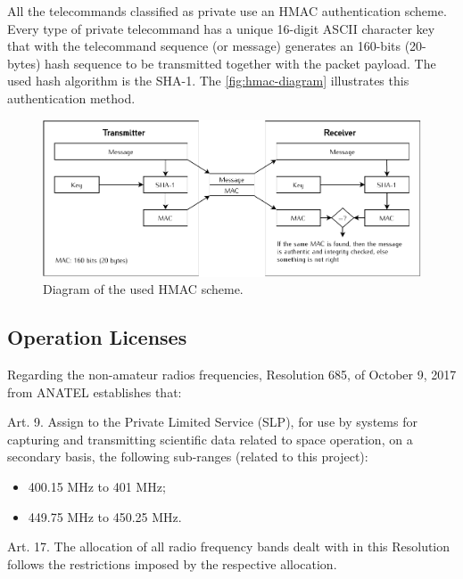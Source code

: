 All the telecommands classified as private use an HMAC authentication scheme. Every type of private telecommand has a unique 16-digit ASCII character key that with the telecommand sequence (or message) generates an 160-bits (20-bytes) hash sequence to be transmitted together with the packet payload. The used hash algorithm is the SHA-1. The \autoref{fig:hmac-diagram} illustrates this authentication method.

\begin{figure}[!htb]
    \begin{center}
        \includegraphics[width=\textwidth]{figures/hmac-diagram.pdf}
        \caption{Diagram of the used HMAC scheme.}
        \label{fig:hmac-diagram}
    \end{center}
\end{figure}

\subsection{Operation Licenses}


Regarding the non-amateur radios frequencies, Resolution 685, of October 9, 2017 from ANATEL establishes that:

Art. 9. Assign to the Private Limited Service (SLP), for use by systems for capturing and transmitting scientific data related to space operation, on a secondary basis, the following sub-ranges (related to this project):

\begin{itemize}
\item 400.15 MHz to 401 MHz;
\item 449.75 MHz to 450.25 MHz.
\end{itemize}

Art. 17. The allocation of all radio frequency bands dealt with in this Resolution follows the restrictions imposed by the respective allocation.


